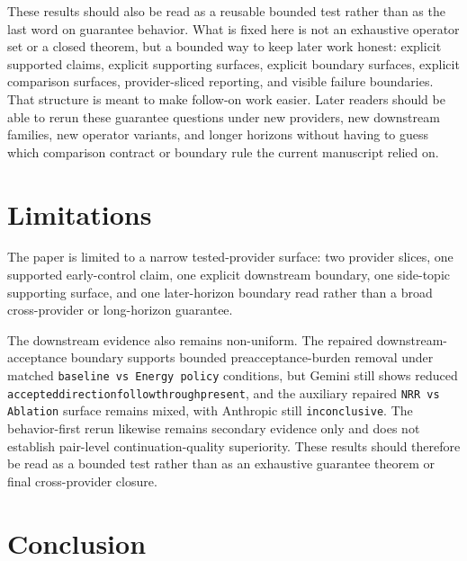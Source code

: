 \documentclass[11pt]{article}
\renewcommand{\_}{\textunderscore\hspace{0pt}}
\begin{document}
These results should also be read as a reusable bounded test rather than as the
last word on guarantee behavior. What is fixed here is not an exhaustive
operator set or a closed theorem, but a bounded way to keep later work honest:
explicit supported claims, explicit supporting surfaces, explicit boundary
surfaces, explicit comparison surfaces, provider-sliced reporting, and visible
failure boundaries. That
structure is meant to make follow-on work easier. Later readers should be able
to rerun these guarantee questions under new providers, new downstream
families, new operator variants, and longer horizons without having to guess
which comparison contract or boundary rule the current manuscript relied on.

\section{Limitations}

The paper is limited to a narrow tested-provider surface: two
provider slices, one supported early-control claim, one explicit downstream
boundary, one side-topic supporting surface, and one later-horizon boundary
read rather than a broad cross-provider or long-horizon guarantee.

The downstream evidence also remains non-uniform. The repaired downstream-
acceptance boundary supports bounded preacceptance-burden removal under matched
\texttt{baseline vs Energy policy} conditions, but Gemini still shows reduced
\texttt{accepted\_direction\_followthrough\_present}, and the auxiliary repaired
\texttt{NRR vs Ablation} surface remains mixed, with Anthropic still
\texttt{inconclusive}. The behavior-first rerun likewise remains secondary
evidence only and does not establish pair-level continuation-quality
superiority. These results should therefore be read as a bounded test rather
than as an exhaustive guarantee theorem or final cross-provider closure.

\section{Conclusion}
\end{document}
